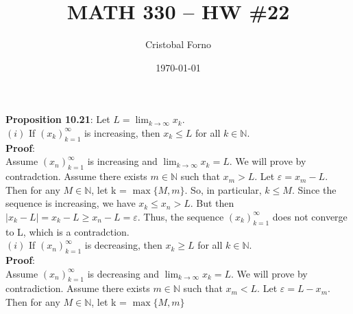 \documentclass[12pt]{article}
\title{MATH 330 -- HW \#22}
\author{Cristobal Forno}
\date{\today}
\begin{document}
\maketitle

\textbf{Proposition 10.21}: Let $L = \lim_{k\to\infty} x_k.$\\
$(i)$ If $(x_k)_{k=1}^\infty$ is increasing, then $x_k \leq L$ for all $k \in \mathbb{N}$.\\
\noindent
\textbf{Proof}:\\
\indent
Assume $(x_n)_{k=1}^\infty$ is increasing and $\lim_{k\to\infty} x_k = L$. We
will prove by contradction. Assume there exists $m \in \mathbb{N}$ such that $x_m
> L$. Let $\varepsilon = x_m - L$. Then for any $M \in \mathbb{N}$, let k =
$\max\{M, m\}$. So, in particular, $k \leq M$. Since the sequence is increasing,
we have $x_k \leq x_n > L$. But then $|x_k - L| = x_k - L \geq x_n - L =
\varepsilon$. Thus, the sequence $(x_k)_{k=1}^\infty$ does not converge to L,
which is a contradction.\\

\noindent
$(i)$ If $(x_n)_{k=1}^\infty$ is decreasing, then $x_k \geq L$ for all $k \in
\mathbb{N}$.\\
\noindent
\textbf{Proof}:\\
\indent
Assume $(x_n)_{k=1}^\infty$ is decreasing and $\lim_{k\to\infty}x_k = L$. We
will prove by contradiction. Assume there exists $m \in \mathbb{N}$ such that
$x_m < L$. Let $\varepsilon = L - x_m$. Then for any $M \in \mathbb{N}$, let k =
$\max\{M, m\}$
\end{document}

